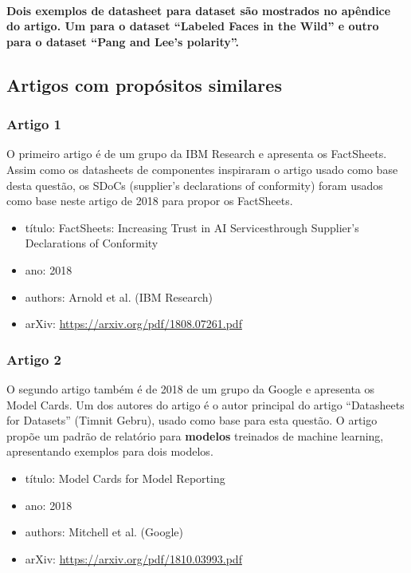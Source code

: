 \documentclass[a4paper]{article}    %
\begin{document}
\paragraph{Dois exemplos de datasheet para dataset são mostrados no apêndice do artigo. Um para o dataset ``Labeled Faces in the Wild'' e outro para o dataset  ``Pang and Lee’s polarity''.}

\subsection{Artigos com propósitos similares}

\subsubsection{Artigo 1}
O primeiro artigo é de um grupo da IBM Research e apresenta os FactSheets. Assim como os datasheets de componentes inspiraram o artigo usado como base desta questão, os SDoCs (supplier’s declarations of conformity) foram usados como base neste artigo de 2018 para propor os FactSheets.

\begin{itemize}
    \setlength\itemsep{0mm}
    \item título: FactSheets:  Increasing Trust in AI Servicesthrough Supplier’s Declarations of Conformity
    \item ano: 2018
    \item authors: Arnold et al. (IBM Research)
    \item arXiv: \href{https://arxiv.org/pdf/1808.07261.pdf}{https://arxiv.org/pdf/1808.07261.pdf}
\end{itemize}

\subsubsection{Artigo 2}
O segundo artigo também é de 2018 de um grupo da Google e apresenta os Model Cards. Um dos autores do artigo é o autor principal do artigo ``Datasheets for Datasets'' (Timnit Gebru), usado como base para esta questão. O artigo propõe um padrão de relatório para \textbf{modelos} treinados de machine learning, apresentando exemplos para dois modelos.

\begin{itemize}
    \setlength\itemsep{0mm}
    \item título: Model Cards for Model Reporting
    \item ano: 2018
    \item authors: Mitchell et al. (Google)
    \item arXiv: \href{https://arxiv.org/pdf/1810.03993.pdf}{https://arxiv.org/pdf/1810.03993.pdf}
\end{itemize}
\end{document}
